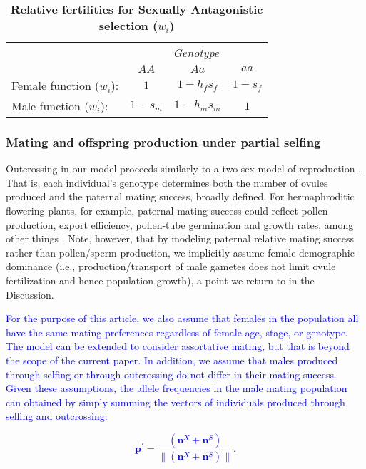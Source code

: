 \documentclass[11pt]{article}
\def\mbf#1{\mathbf{#1}}
\begin{document}
\begin{table}[htbp]
 \centering
 \caption{\bf Relative fertilities for Sexually Antagonistic selection ($w_{i}$)}
\label{tab:Fitness}
\begin{tabular}{lccc}
 \toprule
					&  \multicolumn{3}{c}{{\textit{Genotype}}} \\ 
\cline{2-4}
					& $AA$			& $Aa$ 					& $aa$ 		\\ \hline
Female function ($w_{i}$):	& $1$		& $1 - h_f s_f$	& $1 - s_f$ \\	
Male function ($w^{\prime}_{i}$):		& $1 - s_m$& $1 - h_m s_m$	& $1$ 		\\	
\hline
\end{tabular}
\end{table}

\subsubsection*{Mating and offspring production under partial selfing}
 Outcrossing in our model proceeds similarly to a two-sex model of reproduction \citep{deVriesCaswell2019b}. That is, each individual's genotype determines both the number of ovules produced and the paternal mating success, broadly defined. For hermaphroditic flowering plants, for example, paternal mating success could reflect pollen production, export efficiency, pollen-tube germination and growth rates, among other things \citep{LloydWebb1986, WangBarrett2020, Harder2016}. Note, however, that by modeling paternal relative mating success rather than pollen/sperm production, we implicitly assume female demographic dominance (i.e., production/transport of male gametes does not limit ovule fertilization and hence population growth), a point we return to in the Discussion. 

\textcolor{blue}{ For the purpose of this article, we also assume that females in the population all have the same mating preferences regardless of female age, stage, or genotype. The model can be extended to consider assortative mating, but that is beyond the scope of the current paper. In addition, we assume that males produced through selfing or through outcrossing do not differ in their mating success.  Given these assumptions, the allele frequencies in the male mating population can obtained by simply summing the vectors of individuals produced through selfing and outcrossing:
\begin{linenomath*}
\begin{equation}
 	\mbf{p}^{\prime}=\frac{(\mbf{n}^X + \mbf{n}^S)}{\| (\mbf{n}^X + \mbf{n}^S)\|}.
 \end{equation}
\end{linenomath*}}
\end{document}
